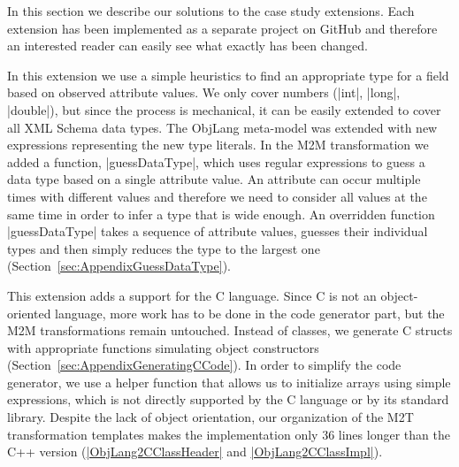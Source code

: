 
\label{sec:Extensions}


In this section we describe our solutions to the case study extensions.
Each extension has been implemented as a separate project on GitHub and therefore an interested reader can easily see what exactly has been changed.

\label{sec:Extension1}

In this extension we use a simple heuristics to find an appropriate type for a field based on observed attribute values.
We only cover numbers (\Scala|int|, \Scala|long|, \Scala|double|), but since the process is mechanical, it can be easily extended to cover all XML Schema data types.
%
The ObjLang meta-model was extended with new expressions representing the new type literals.
In the M2M transformation we added a function, \Scala|guessDataType|, which uses regular expressions to guess a data type based on a single attribute value.
An attribute can occur multiple times with different values and therefore we need to consider all values at the same time in order to infer a type that is wide enough.
An overridden function \Scala|guessDataType| takes a sequence of attribute values, guesses their individual types and then simply reduces the type to the largest one (\Cf Section~\ref{sec:AppendixGuessDataType}).

\label{sec:Extension2}

This extension adds a support for the C language.
Since C is not an object-oriented language, more work has to be done in the code generator part, but the M2M transformations remain untouched.
%
Instead of classes, we generate C structs with appropriate functions simulating object constructors (\Cf Section~\ref{sec:AppendixGeneratingCCode}).
In order to simplify the code generator, we use a helper function that allows us to initialize arrays using simple expressions, which is not directly supported by the C language or by its standard library.
%
Despite the lack of object orientation, our organization of the M2T transformation templates makes the implementation only 36 lines longer than the C++ version (\Cf \href{https://github.com/fikovnik/ttc14-fixml-sigma/blob/master/ttc14-fixml-extension-2/src/fr/inria/spirals/sigma/ttc14/fixml/ObjLang2CClassHeader.scala}{\Scala|ObjLang2CClassHeader|} and \href{https://github.com/fikovnik/ttc14-fixml-sigma/blob/master/ttc14-fixml-extension-2/src/fr/inria/spirals/sigma/ttc14/fixml/ObjLang2CClassHeader.scala}{\Scala|ObjLang2CClassImpl|}).

